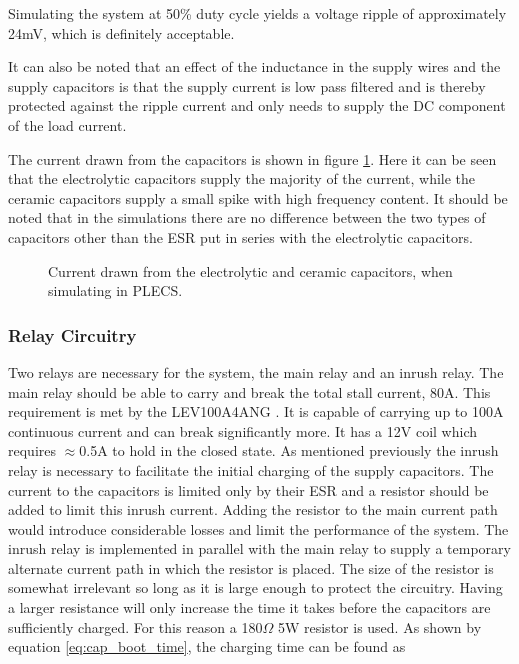 Simulating the system at 50\% duty cycle yields a voltage ripple of approximately 24mV, which is definitely acceptable. 

It can also be noted that an effect of the inductance in the supply wires and the supply capacitors is that the supply current is low pass filtered and is thereby protected against the ripple current and only needs to supply the DC component of the load current.

The current drawn from the capacitors is shown in figure \ref{fig:cap_currents}.
Here it can be seen that the electrolytic capacitors supply the majority of the current, while the ceramic capacitors supply a small spike with high frequency content.
It should be noted that in the simulations there are no difference between the two types of capacitors other than the ESR put in series with the electrolytic capacitors. 

\begin{figure}[h]
	\centering
	\caption[Capacitor current simulation in PLECS.]{Current drawn from the electrolytic and ceramic capacitors, when simulating in PLECS. }
	\label{fig:cap_currents}
\end{figure}

\subsubsection{Relay Circuitry} %
\label{ssub:relay_circuitry}
Two relays are necessary for the system, the main relay and an inrush relay.
The main relay should be able to carry and break the total stall current, 80A.
This requirement is met by the LEV100A4ANG \cite{lev100}.
It is capable of carrying up to 100A continuous current and can break significantly more.
It has a 12V coil which requires $\approx$0.5A to hold in the closed state.
As mentioned previously the inrush relay is necessary to facilitate the initial charging of the supply capacitors.
The current to the capacitors is limited only by their ESR and a resistor should be added to limit this inrush current.
Adding the resistor to the main current path would introduce considerable losses and limit the performance of the system.
The inrush relay is implemented in parallel with the main relay to supply a temporary alternate current path in which the resistor is placed.
The size of the resistor is somewhat irrelevant so long as it is large enough to protect the circuitry.
Having a larger resistance will only increase the time it takes before the capacitors are sufficiently charged.
For this reason a 180$\Omega$ 5W resistor is used.
As shown by equation \ref{eq:cap_boot_time}, the charging time can be found as 

